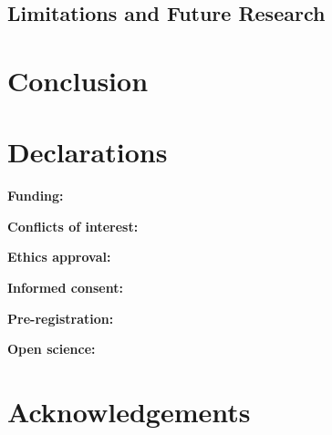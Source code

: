\documentclass[11pt,a4paper]{article}
\begin{document}
\subsection{Limitations and Future Research}

\section{Conclusion}
\label{sec:conclusion}

\section*{Declarations}

\noindent\textbf{Funding:} %

\noindent\textbf{Conflicts of interest:} %

\noindent\textbf{Ethics approval:} %

\noindent\textbf{Informed consent:} %

\noindent\textbf{Pre-registration:} %

\noindent\textbf{Open science:} %

\section*{Acknowledgements}
\end{document}
